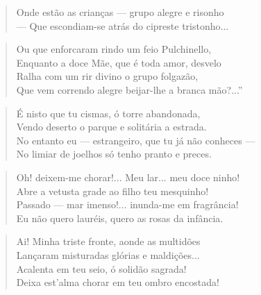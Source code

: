 \begin{anexosenv}
\begin{verse}
Onde estão as crianças — grupo alegre e risonho \\
— Que escondiam-se atrás do cipreste tristonho... \\
\end{verse}

\begin{verse}
Ou que enforcaram rindo um feio Pulchinello, \\
Enquanto a doce Mãe, que é toda amor, desvelo \\
Ralha com um rir divino o grupo folgazão, \\
Que vem correndo alegre beijar-lhe a branca mão?...'' \\
\end{verse}

\begin{verse}
É nisto que tu cismas, ó torre abandonada, \\
Vendo deserto o parque e solitária a estrada. \\
No entanto eu — estrangeiro, que tu já não conheces — \\
No limiar de joelhos só tenho pranto e preces. \\
\end{verse}

\begin{verse}
Oh! deixem-me chorar!... Meu lar... meu doce ninho! \\
Abre a vetusta grade ao filho teu mesquinho! \\
Passado — mar imenso!... inunda-me em fragrância! \\
Eu não quero lauréis, quero as rosas da infância. \\
\end{verse}

\begin{verse}
Ai! Minha triste fronte, aonde as multidões \\
Lançaram misturadas glórias e maldições... \\
Acalenta em teu seio, ó solidão sagrada! \\
Deixa est'alma chorar em teu ombro encostada! \\
\end{verse}


\end{anexosenv}

